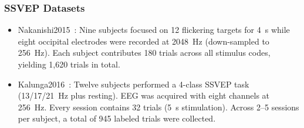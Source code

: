 \documentclass[journal]{IEEEtran}
\theoremstyle{plain}
\begin{document}
\subsubsection{SSVEP Datasets}
    \begin{itemize}
        \item Nakanishi2015~\cite{nakanishi2015}: Nine subjects focused on 12 flickering targets for 4~s while eight occipital electrodes were recorded at 2048~Hz (down-sampled to 256~Hz). Each subject contributes 180 trials across all stimulus codes, yielding 1,620 trials in total.
        \item Kalunga2016~\cite{kalunga2016}: Twelve subjects performed a 4-class SSVEP task (13/17/21~Hz plus resting). EEG was acquired with eight channels at 256~Hz. Every session contains 32 trials (5~s stimulation). Across 2–5 sessions per subject, a total of 945 labeled trials were collected.
     \end{itemize}
\end{document}
